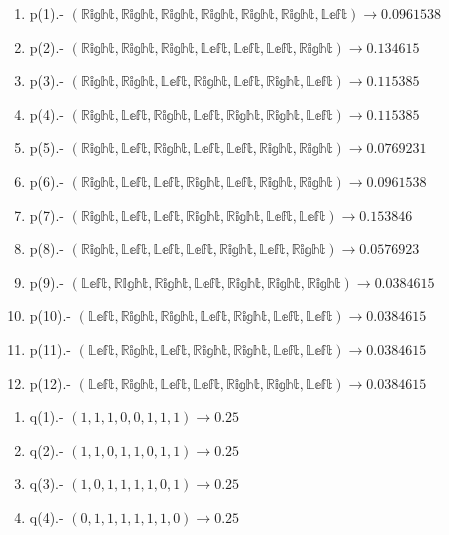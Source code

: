\documentclass[a4paper,10pt]{article}
\begin{document}
\begin{enumerate}
  \item p(1).- $(\mathbb{Right},\mathbb{Right},\mathbb{Right},\mathbb{Right},\mathbb{Right},\mathbb{Right},\mathbb{Left}) \to 0.0961538$
  \item p(2).- $(\mathbb{Right},\mathbb{Right},\mathbb{Right},\mathbb{Left},\mathbb{Left},\mathbb{Left},\mathbb{Right}) \to 0.134615$
  \item p(3).- $(\mathbb{Right},\mathbb{Right},\mathbb{Left},\mathbb{Right},\mathbb{Left},\mathbb{Right},\mathbb{Left}) \to 0.115385$
  \item p(4).- $(\mathbb{Right},\mathbb{Left},\mathbb{Right},\mathbb{Left},\mathbb{Right},\mathbb{Right},\mathbb{Left}) \to 0.115385$
  \item p(5).- $(\mathbb{Right},\mathbb{Left},\mathbb{Right},\mathbb{Left},\mathbb{Left},\mathbb{Right},\mathbb{Right}) \to 0.0769231$
  \item p(6).- $(\mathbb{Right},\mathbb{Left},\mathbb{Left},\mathbb{Right},\mathbb{Left},\mathbb{Right},\mathbb{Right}) \to 0.0961538$
  \item p(7).- $(\mathbb{Right},\mathbb{Left},\mathbb{Left},\mathbb{Right},\mathbb{Right},\mathbb{Left},\mathbb{Left}) \to 0.153846$
  \item p(8).- $(\mathbb{Right},\mathbb{Left},\mathbb{Left},\mathbb{Left},\mathbb{Right},\mathbb{Left},\mathbb{Right}) \to 0.0576923$
  \item p(9).- $(\mathbb{Left},\mathbb{RIght},\mathbb{Right},\mathbb{Left},\mathbb{Right},\mathbb{Right},\mathbb{Right}) \to 0.0384615$
  \item p(10).- $(\mathbb{Left},\mathbb{Right},\mathbb{Right},\mathbb{Left},\mathbb{Right},\mathbb{Left},\mathbb{Left}) \to 0.0384615$
  \item p(11).- $(\mathbb{Left},\mathbb{Right},\mathbb{Left},\mathbb{Right},\mathbb{Right},\mathbb{Left},\mathbb{Left}) \to 0.0384615$
  \item p(12).- $(\mathbb{Left},\mathbb{Right},\mathbb{Left},\mathbb{Left},\mathbb{Right},\mathbb{Right},\mathbb{Left}) \to 0.0384615$
\end{enumerate}

\begin{enumerate}
  \item q(1).- $(1,1,1,0,0,1,1,1) \to 0.25$
  \item q(2).- $(1,1,0,1,1,0,1,1) \to 0.25$
  \item q(3).- $(1,0,1,1,1,1,0,1) \to 0.25$
  \item q(4).- $(0,1,1,1,1,1,1,0) \to 0.25$
\end{enumerate}
\end{document}
